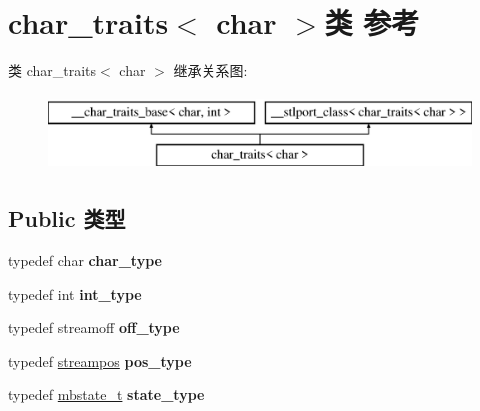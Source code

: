 \hypertarget{classchar__traits_3_01char_01_4}{}\section{char\+\_\+traits$<$ char $>$类 参考}
\label{classchar__traits_3_01char_01_4}
类 char\+\_\+traits$<$ char $>$ 继承关系图\+:\begin{figure}[H]
\begin{center}
\leavevmode
\includegraphics[height=2.000000cm]{classchar__traits_3_01char_01_4}
\end{center}
\end{figure}
\subsection*{Public 类型}
\begin{DoxyCompactItemize}
\item 
\mbox{\label{classchar__traits_3_01char_01_4_a49803803b272b576400779b243a32386}} 
typedef char {\bfseries char\+\_\+type}
\item 
\mbox{\label{classchar__traits_3_01char_01_4_add35c0ef7d26ddd23bf45ad1d2140287}} 
typedef int {\bfseries int\+\_\+type}
\item 
\mbox{\label{classchar__traits_3_01char_01_4_a5384c97a4b666a8aef17516ffb4b2c04}} 
typedef streamoff {\bfseries off\+\_\+type}
\item 
\mbox{\label{classchar__traits_3_01char_01_4_a86d38fe33a3953e735c1bb5dca8ce624}} 
typedef \hyperlink{classfpos}{streampos} {\bfseries pos\+\_\+type}
\item 
\mbox{\label{classchar__traits_3_01char_01_4_a66d27cac2d3c1509a86e5d361253c5ae}} 
typedef \hyperlink{struct____mbstate__t}{mbstate\+\_\+t} {\bfseries state\+\_\+type}
\end{DoxyCompactItemize}
